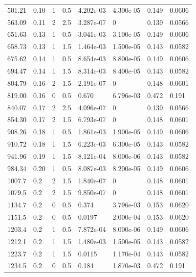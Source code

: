 \documentclass[preview]{standalone}
\begin{document}
{{\begin{tabular}{L{1.2cm}C{1.2cm} C{0.3cm}C{0.5cm} C{1.4cm}C{1.4cm} C{1.4cm}C{1.4cm}}
  501.21  &  0.10  & 1     & 0.5 &  4.202e-03  & 4.300e-05  & 0.149 &  0.0606   \\ 
  563.09  &  0.11  & 2     & 2.5 &  3.287e-07  & 0  & 0.139 &  0.0566   \\ 
  651.63  &  0.13  & 1     & 0.5 &  3.041e-03  & 3.100e-05  & 0.149 &  0.0606   \\ 
  658.73  &  0.13  & 1     & 1.5 &  1.464e-03  & 1.500e-05  & 0.143 &  0.0582   \\ 
  675.62  &  0.14  & 1     & 0.5 &  8.654e-03  & 8.800e-05  & 0.149 &  0.0606   \\ 
  694.47  &  0.14  & 1     & 1.5 &  8.314e-03  & 8.400e-05  & 0.143 &  0.0582   \\ 
  804.79  &  0.16  & 2     & 1.5 &  2.191e-07  & 0  & 0.148 &  0.0601   \\ 
  819.00  &  0.16  & 0     & 0.5 &  0.670  & 6.796e-03  & 0.472 &  0.191   \\ 
  840.07  &  0.17  & 2     & 2.5 &  4.096e-07  & 0  & 0.139 &  0.0566   \\ 
  854.30  &  0.17  & 2     & 1.5 &  6.793e-07  & 0  & 0.148 &  0.0601   \\ 
  908.26  &  0.18  & 1     & 0.5 &  1.861e-03  & 1.900e-05  & 0.149 &  0.0606   \\ 
  910.72  &  0.18  & 1     & 1.5 &  6.223e-03  & 6.300e-05  & 0.143 &  0.0582   \\ 
  941.96  &  0.19  & 1     & 1.5 &  8.121e-04  & 8.000e-06  & 0.143 &  0.0582   \\ 
  984.34  &  0.20  & 1     & 0.5 &  8.087e-03  & 8.200e-05  & 0.149 &  0.0606   \\ 
  1007.7  &   0.2  & 2     & 1.5 &  1.840e-07  & 0  & 0.148 &  0.0601   \\ 
  1079.5  &   0.2  & 2     & 1.5 &  9.850e-07  & 0  & 0.148 &  0.0601   \\ 
  1134.7  &   0.2  & 0     & 0.5 &  0.374  & 3.796e-03  & 0.153 &  0.0620   \\ 
  1151.5  &   0.2  & 0     & 0.5 &  0.0197  & 2.000e-04  & 0.153 &  0.0620   \\ 
  1203.4  &   0.2  & 1     & 0.5 &  7.872e-04  & 8.000e-06  & 0.149 &  0.0606   \\ 
  1212.1  &   0.2  & 1     & 1.5 &  1.480e-03  & 1.500e-05  & 0.143 &  0.0582   \\ 
  1223.7  &   0.2  & 1     & 1.5 &  0.0115  & 1.170e-04  & 0.143 &  0.0582   \\ 
  1234.5  &   0.2  & 0     & 0.5 &  0.184  & 1.870e-03  & 0.472 &  0.191   \\ 

\end{tabular}}}
\end{document}
